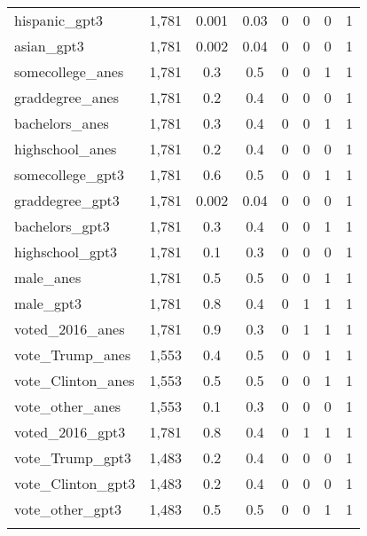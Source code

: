 \begin{table}[!htbp]
\begin{tabular}{@{\extracolsep{5pt}}lccccccc}
hispanic\_gpt3 & 1,781 & 0.001 & 0.03 & 0 & 0 & 0 & 1 \\ 
asian\_gpt3 & 1,781 & 0.002 & 0.04 & 0 & 0 & 0 & 1 \\ 
somecollege\_anes & 1,781 & 0.3 & 0.5 & 0 & 0 & 1 & 1 \\ 
graddegree\_anes & 1,781 & 0.2 & 0.4 & 0 & 0 & 0 & 1 \\ 
bachelors\_anes & 1,781 & 0.3 & 0.4 & 0 & 0 & 1 & 1 \\ 
highschool\_anes & 1,781 & 0.2 & 0.4 & 0 & 0 & 0 & 1 \\ 
somecollege\_gpt3 & 1,781 & 0.6 & 0.5 & 0 & 0 & 1 & 1 \\ 
graddegree\_gpt3 & 1,781 & 0.002 & 0.04 & 0 & 0 & 0 & 1 \\ 
bachelors\_gpt3 & 1,781 & 0.3 & 0.4 & 0 & 0 & 1 & 1 \\ 
highschool\_gpt3 & 1,781 & 0.1 & 0.3 & 0 & 0 & 0 & 1 \\ 
male\_anes & 1,781 & 0.5 & 0.5 & 0 & 0 & 1 & 1 \\ 
male\_gpt3 & 1,781 & 0.8 & 0.4 & 0 & 1 & 1 & 1 \\ 
voted\_2016\_anes & 1,781 & 0.9 & 0.3 & 0 & 1 & 1 & 1 \\ 
vote\_Trump\_anes & 1,553 & 0.4 & 0.5 & 0 & 0 & 1 & 1 \\ 
vote\_Clinton\_anes & 1,553 & 0.5 & 0.5 & 0 & 0 & 1 & 1 \\ 
vote\_other\_anes & 1,553 & 0.1 & 0.3 & 0 & 0 & 0 & 1 \\ 
voted\_2016\_gpt3 & 1,781 & 0.8 & 0.4 & 0 & 1 & 1 & 1 \\ 
vote\_Trump\_gpt3 & 1,483 & 0.2 & 0.4 & 0 & 0 & 0 & 1 \\ 
vote\_Clinton\_gpt3 & 1,483 & 0.2 & 0.4 & 0 & 0 & 0 & 1 \\ 
vote\_other\_gpt3 & 1,483 & 0.5 & 0.5 & 0 & 0 & 1 & 1 \\ 
\hline \\[-1.8ex] 
\end{tabular} 
\end{table} 
